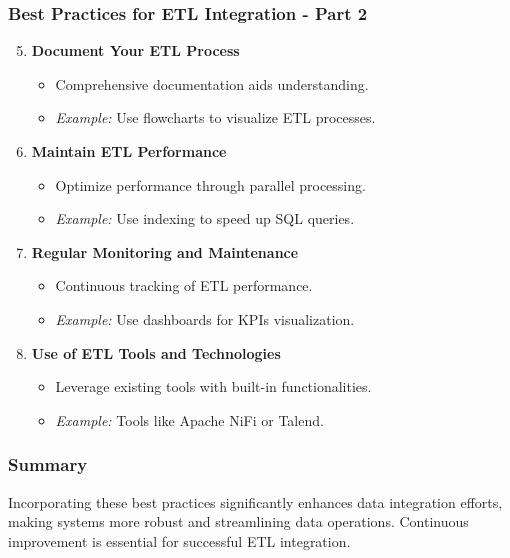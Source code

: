 \documentclass[aspectratio=169]{beamer}
\begin{document}
\begin{frame}[fragile]
    \frametitle{Best Practices for ETL Integration - Part 2}
    \begin{enumerate}
        \setcounter{enumi}{4} %
        \item \textbf{Document Your ETL Process}
            \begin{itemize}
                \item Comprehensive documentation aids understanding.
                \item \textit{Example:} Use flowcharts to visualize ETL processes.
            \end{itemize}

        \item \textbf{Maintain ETL Performance}
            \begin{itemize}
                \item Optimize performance through parallel processing.
                \item \textit{Example:} Use indexing to speed up SQL queries.
            \end{itemize}

        \item \textbf{Regular Monitoring and Maintenance}
            \begin{itemize}
                \item Continuous tracking of ETL performance.
                \item \textit{Example:} Use dashboards for KPIs visualization.
            \end{itemize}

        \item \textbf{Use of ETL Tools and Technologies}
            \begin{itemize}
                \item Leverage existing tools with built-in functionalities.
                \item \textit{Example:} Tools like Apache NiFi or Talend.
            \end{itemize}
    \end{enumerate}
\end{frame}

\begin{frame}[fragile]
    \frametitle{Summary}
    Incorporating these best practices significantly enhances data integration efforts, making systems more robust and streamlining data operations. Continuous improvement is essential for successful ETL integration.
\end{frame}
\end{document}

